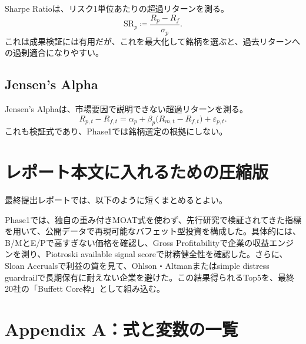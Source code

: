 \documentclass[11pt,a4paper]{article}
\begin{document}
Sharpe Ratioは、リスク1単位あたりの超過リターンを測る。
\begin{equation}
\mathrm{SR}_p \coloneqq \frac{R_p-R_f}{\sigma_p}.
\label{eq:sharpe}
\end{equation}
これは成果検証には有用だが、これを最大化して銘柄を選ぶと、過去リターンへの過剰適合になりやすい。

\subsection{Jensen's Alpha}

Jensen's Alphaは、市場要因で説明できない超過リターンを測る。
\begin{equation}
R_{p,t}-R_{f,t}=\alpha_p+\beta_p\bigl(R_{m,t}-R_{f,t}\bigr)+\varepsilon_{p,t}.
\label{eq:jensen}
\end{equation}
これも検証式であり、Phase1では銘柄選定の根拠にしない。

\clearpage
\section{レポート本文に入れるための圧縮版}

最終提出レポートでは、以下のように短くまとめるとよい。

\begin{keybox}[本文用要約案]
Phase1では、独自の重み付きMOAT式を使わず、先行研究で検証されてきた指標を用いて、公開データで再現可能なバフェット型投資を構成した。具体的には、B/MとE/Pで高すぎない価格を確認し、Gross Profitabilityで企業の収益エンジンを測り、Piotroski available signal scoreで財務健全性を確認した。さらに、Sloan Accrualsで利益の質を見て、Ohlson・Altmanまたはsimple distress guardrailで長期保有に耐えない企業を避けた。この結果得られるTop5を、最終20社の「Buffett Core枠」として組み込む。
\end{keybox}

\clearpage
\section{Appendix A：式と変数の一覧}
\end{document}
